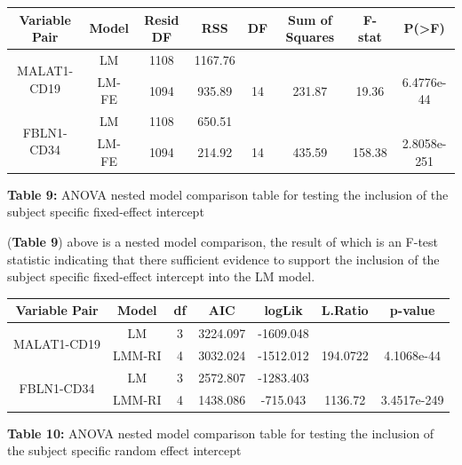 \documentclass[12pt,]{article}
\begin{document}
\begin{center}
\begin{tabular}{|c|c|c|c|c|c|c|c|}
\hline
Variable Pair & Model & Resid DF & RSS & DF & Sum of Squares & F-stat & P(>F) \\
\hline
\hline
\multirow{2}{*}{MALAT1-CD19} & LM & 1108 & 1167.76 & & & & \\
 & LM-FE & 1094 & 935.89 & 14 & 231.87 & 19.36 &  6.4776e-44 \\
\hline
\hline
\multirow{2}{*}{FBLN1-CD34} & LM & 1108 & 650.51 & & & & \\
 & LM-FE & 1094 & 214.92 & 14 & 435.59 & 158.38 &  2.8058e-251 \\
\hline
\hline
\end{tabular}

\vspace{5pt}

\textbf{Table 9:} ANOVA nested model comparison table for testing the inclusion of the subject specific fixed-effect intercept
\end{center}

(\textbf{Table 9}) above is a nested model comparison, the result of
which is an F-test statistic indicating that there sufficient evidence
to support the inclusion of the subject specific fixed-effect intercept
into the LM model.

\vspace{10pt}

\begin{center}
\begin{tabular}{|c|c|c|c|c|c|c|}
\hline
Variable Pair & Model & df & AIC & logLik & L.Ratio & p-value \\
\hline
\hline
\multirow{2}{*}{MALAT1-CD19} & LM & 3 & 3224.097 & -1609.048 &  & \\
 & LMM-RI & 4 & 3032.024 & -1512.012 & 194.0722 & 4.1068e-44  \\
\hline
\hline
\multirow{2}{*}{FBLN1-CD34} & LM & 3 & 2572.807 & -1283.403 &  & \\
 & LMM-RI & 4 & 1438.086 & -715.043 & 1136.72 & 3.4517e-249  \\
\hline
\hline
\end{tabular}

\vspace{5pt}

\textbf{Table 10:} ANOVA nested model comparison table for testing the inclusion of the subject specific random effect intercept
\end{center}
\end{document}
